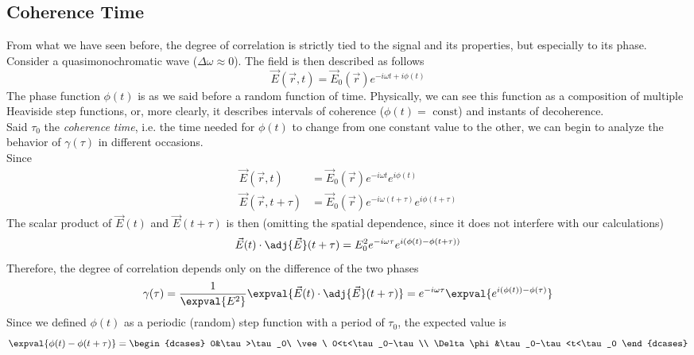 \documentclass[../electromagnetism.tex]{subfiles}
\begin{document}
\subsection{Coherence Time}
From what we have seen before, the degree of correlation is strictly tied to the signal and its properties, but especially to its phase.\\
Consider a quasimonochromatic wave ($\Delta\omega\approx0$). The field is then described as follows
\begin{equation}
	\vec{E}(\vec{r},t)=\vec{E}_0(\vec{r})e^{-i\omega t+i\phi(t)}
	\label{eq:quasimonochromaticwave.ctm}
\end{equation}
The phase function $\phi(t)$ is as we said before a random function of time. Physically, we can see this function as a composition of multiple Heaviside step functions, or, more clearly, it describes intervals of coherence ($\phi(t)=\text{ const}$) and instants of decoherence.\\
Said $\tau_0$ the \textit{coherence time}, i.e. the time needed for $\phi(t)$ to change from one constant value to the other, we can begin to analyze the behavior of $\gamma(\tau)$ in different occasions.\\
Since
\begin{equation*}
	\begin{aligned}
		\vec{E}(\vec{r},t)&= \vec{E}_0(\vec{r})e^{-i\omega t}e^{i\phi(t)}\\
		\vec{E}(\vec{r},t+\tau)&= \vec{E}_0(\vec{r})e^{-i\omega(t+\tau)}e^{i\phi(t+\tau)}
	\end{aligned}
\end{equation*}
The scalar product of $\vec{E}(t)$ and $\vec{E}(t+\tau)$ is then (omitting the spatial dependence, since it does not interfere with our calculations)
\begin{equation*}
	\vec{E}(t)\cdot\adj{\vec{E}}(t+\tau)=E_0^2e^{-i\omega\tau}e^{i\left( \phi(t)-\phi(t+\tau) \right)}
\end{equation*}
Therefore, the degree of correlation depends only on the difference of the two phases
\begin{equation*}
	\gamma(\tau)=\frac{1}{\expval{E^2}}\expval{\vec{E}(t)\cdot\adj{\vec{E}}(t+\tau)}=e^{-i\omega\tau}\expval{e^{i(\phi(t))-\phi(\tau)}}
\end{equation*}
Since we defined $\phi(t)$ as a periodic (random) step function with a period of $\tau_0$, the expected value is
\begin{equation}
	\expval{\phi(t)-\phi(t+\tau)}=\begin{dcases}
		0&\tau>\tau_0\ \vee\ 0<t<\tau_0-\tau\\
		\Delta\phi&\tau_0-\tau<t<\tau_0
	\end{dcases}
	\label{eq:expvalphase.ctm}
\end{equation}
\end{document}
